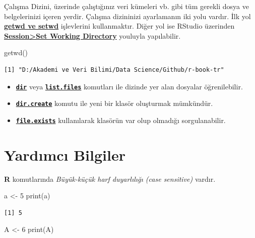 \documentclass[
  letterpaper,
  DIV=11,
  numbers=noendperiod]{scrreprt}
\newenvironment{Shaded}{\begin{snugshade}}{\end{snugshade}}
\newcommand{\DecValTok}[1]{\textcolor[rgb]{0.68,0.00,0.00}{#1}}
\newcommand{\FunctionTok}[1]{\textcolor[rgb]{0.28,0.35,0.67}{#1}}
\newcommand{\NormalTok}[1]{\textcolor[rgb]{0.00,0.23,0.31}{#1}}
\newcommand{\OtherTok}[1]{\textcolor[rgb]{0.00,0.23,0.31}{#1}}
\begin{document}
Çalışma Dizini, üzerinde çalıştığınız veri kümeleri vb. gibi tüm gerekli
dosya ve belgelerinizi içeren yerdir. Çalışma dizininizi ayarlamanın iki
yolu vardır. İlk yol \ul{\textbf{getwd ve setwd}} işlevlerini
kullanmaktır. Diğer yol ise RStudio üzerinden
\ul{\textbf{Session\textgreater Set Working Directory}} youluyla
yapılabilir.

\begin{Shaded}
\begin{Highlighting}[]
\FunctionTok{getwd}\NormalTok{()}
\end{Highlighting}
\end{Shaded}

\begin{verbatim}
[1] "D:/Akademi ve Veri Bilimi/Data Science/Github/r-book-tr"
\end{verbatim}

\begin{itemize}
\item
  \ul{\textbf{\texttt{dir}}} veya \ul{\textbf{\texttt{list.files}}}
  komutları ile dizinde yer alan dosyalar öğrenilebilir.
\item
  \ul{\textbf{\texttt{dir.create}}} komutu ile yeni bir klasör
  oluşturmak mümkündür.
\item
  \ul{\textbf{\texttt{file.exists}}} kullanılarak klasörün var olup
  olmadığı sorgulanabilir.
\end{itemize}

\hypertarget{yardux131mcux131-bilgiler}{%
\section{Yardımcı Bilgiler}\label{yardux131mcux131-bilgiler}}

\textbf{R} komutlarında \emph{Büyük-küçük harf duyarlılığı (case
sensitive)} vardır.

\begin{Shaded}
\begin{Highlighting}[]
\NormalTok{a }\OtherTok{\textless{}{-}} \DecValTok{5}  
\FunctionTok{print}\NormalTok{(a)  }
\end{Highlighting}
\end{Shaded}

\begin{verbatim}
[1] 5
\end{verbatim}

\begin{Shaded}
\begin{Highlighting}[]
\NormalTok{A }\OtherTok{\textless{}{-}} \DecValTok{6}  
\FunctionTok{print}\NormalTok{(A) }
\end{Highlighting}
\end{Shaded}
\end{document}
